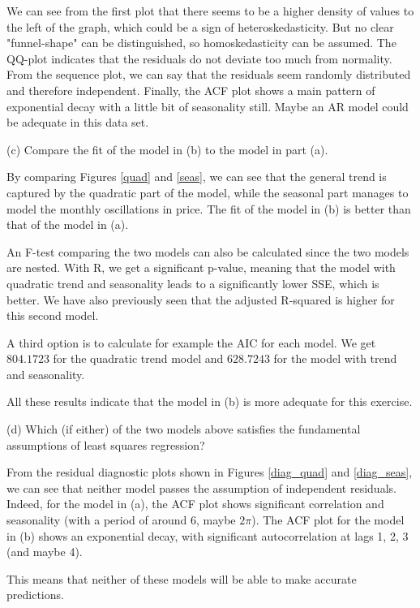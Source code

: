 \documentclass[]{article}
\begin{document}
We can see from the first plot that there seems to be a higher density of values to the left of the graph, which could be a sign of heteroskedasticity. But no clear "funnel-shape" can be distinguished, so homoskedasticity can be assumed. The QQ-plot indicates that the residuals do not deviate too much from normality. From the sequence plot, we can say that the residuals seem randomly distributed and therefore independent. Finally, the ACF plot shows a main pattern of exponential decay with a little bit of seasonality still. Maybe an AR model could be adequate in this data set.

\color{black}

(c) Compare the fit of the model in (b) to the model in part (a).

\color{blue}
By comparing Figures \ref{quad} and \ref{seas}, we can see that the general trend is captured by the quadratic part of the model, while the seasonal part manages to model the monthly oscillations in price. The fit of the model in (b) is better than that of the model in (a).

An F-test comparing the two models can also be calculated since the two models are nested. With R, we get a significant p-value, meaning that the model with quadratic trend and seasonality leads to a significantly lower SSE, which is better. We have also previously seen that the adjusted R-squared is higher for this second model.

A third option is to calculate for example the AIC for each model. We get $804.1723$ for the quadratic trend model and $628.7243$ for the model with trend and seasonality.

All these results indicate that the model in (b) is more adequate for this exercise. 
\color{black}

(d) Which (if either) of the two models above satisfies the fundamental assumptions of least squares regression?

\color{blue}
From the residual diagnostic plots shown in Figures \ref{diag_quad} and \ref{diag_seas}, we can see that neither model passes the assumption of independent residuals. Indeed, for the model in (a), the ACF plot shows significant correlation and seasonality (with a period of around 6, maybe $2\pi$). The ACF plot for the model in (b) shows an exponential decay, with significant autocorrelation at lags 1, 2, 3 (and maybe 4).

This means that neither of these models will be able to make accurate predictions.
\color{black}
\end{document}
